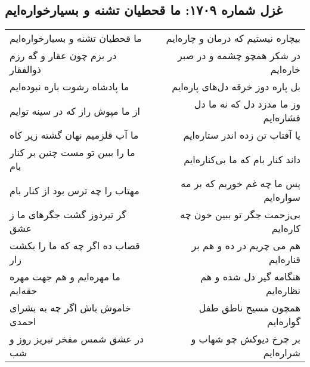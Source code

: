 \begin{center}
\section*{غزل شماره ۱۷۰۹: ما قحطیان تشنه و بسیارخواره‌ایم}
\label{sec:1709}
\begin{longtable}{l p{0.5cm} r}
ما قحطیان تشنه و بسیارخواره‌ایم
&&
بیچاره نیستیم که درمان و چاره‌ایم
\\
در بزم چون عقار و گه رزم ذوالفقار
&&
در شکر همچو چشمه و در صبر خاره‌ایم
\\
ما پادشاه رشوت باره نبوده‌ایم
&&
بل پاره دوز خرقه دل‌های پاره‌ایم
\\
از ما مپوش راز که در سینه توایم
&&
وز ما مدزد دل که نه ما دل فشاره‌ایم
\\
ما آب قلزمیم نهان گشته زیر کاه
&&
یا آفتاب تن زده اندر ستاره‌ایم
\\
ما را ببین تو مست چنین بر کنار بام
&&
داند کنار بام که ما بی‌کناره‌ایم
\\
مهتاب را چه ترس بود از کنار بام
&&
پس ما چه غم خوریم که بر مه سواره‌ایم
\\
گر تیردوز گشت جگرهای ما ز عشق
&&
بی‌زحمت جگر تو ببین خون چه کاره‌ایم
\\
قصاب ده اگر چه که ما را بکشت زار
&&
هم می چریم در ده و هم بر قناره‌ایم
\\
ما مهره‌ایم و هم جهت مهره حقه‌ایم
&&
هنگامه گیر دل شده و هم نظاره‌ایم
\\
خاموش باش اگر چه به بشرای احمدی
&&
همچون مسیح ناطق طفل گواره‌ایم
\\
در عشق شمس مفخر تبریز روز و شب
&&
بر چرخ دیوکش چو شهاب و شراره‌ایم
\\
\end{longtable}
\end{center}
